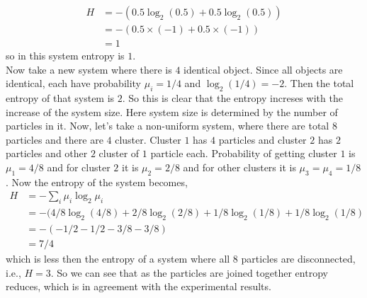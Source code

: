 	\begin{align}
		H &= - (0.5 \log_{2} (0.5) + 0.5 \log_{2} (0.5)) \nonumber \\ 
		&= - (0.5 \times (-1) + 0.5 \times (-1)) \nonumber \\ 
		&= 1 \nonumber
	\end{align}
	so in this system entropy is $1$.\\
	Now take a new system where there is $4$ identical object. Since all objects are identical, each have probability $\mu_i = 1/4$ and $\log_{2} (1/4) = -2$. Then the total entropy of that system is $2$. So this is clear that the entropy increses with the increase of the system size. Here system size is determined by the number of particles in it. Now, let's take a non-uniform system, where there are total $8$ particles and there are $4$ cluster. Cluster $1$ has $4$ particles and cluster $2$ has $2$ particles and other $2$ cluster of $1$ particle each. Probability of getting cluster $1$ is $\mu_1 = 4/8$ and for cluster $2$ it is $\mu_2 = 2/8$ and for other clusters it is $\mu_3 = \mu_4 = 1/8$. Now the entropy of the system becomes,
	\begin{align}
		H &= - \sum_i \mu_i \log_2 \mu_i \nonumber \\
		&= - (4/8 \log_2 (4/8) + 2/8 \log_2 (2/8) + 1/8 \log_2(1/8) + 1/8 \log_2(1/8) \nonumber \\
		&= - (-1/2 -1/2 -3/8 -3/8) \nonumber \\
		&= 7/4 \nonumber
	\end{align}
	which is less then the entropy of a system where all $8$ particles are disconnected, i.e., $H=3$. So we can see that as the particles are joined together entropy reduces, which is in agreement with the experimental results. 
